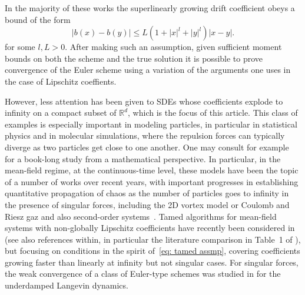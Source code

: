 \documentclass{article}
\newcommand{\pierre}[1]{\textcolor{blue}{#1}}
\begin{document}
In the majority of these works the superlinearly growing drift coefficient obeys a bound of the form
\begin{equation}\label{eq: tamed assmp}
    \lvert b(x)-b(y)\rvert\leq L(1+\lvert x\rvert^l+\lvert y\rvert^l)\lvert x-y\rvert.
\end{equation}
for some $l,L>0$. After making such an assumption, given sufficient moment bounds on both the scheme and the true solution it is possible to prove convergence of the Euler scheme using a variation of the arguments one uses in the case of Lipschitz coeffients.

However, less attention has been given to SDEs whose coefficients explode to infinity on a compact 
subset of $\mathbb{R}^d$, which is the focus of this article. This class of examples is especially important in modeling particles, in particular in statistical physics and in molecular simulations, where the repulsion forces can typically diverge as two particles get close to one another. One may consult \cite{29acd3d494044594aea0829ef236aad6} for example for a book-long study from a mathematical perspective. In particular, in the mean-field regime, at the continuous-time level, these models have been the topic of a number of works over recent years, with important progresses in establishing quantitative propagation of chaos as the number of particles goes to infinity in the presence of singular forces, including the 2D vortex model \cite{jabin2018quantitative,guillin2024uniform,monmarche2024time,wang2025sharp} or Coulomb and Riesz gaz \cite{Serfaty,de2023sharp,Guillin2022OnSO} and also second-order systems~\cite{2024arXiv240204695B}. Tamed algorithms for mean-field systems with non-globally Lipschitz  coefficients have recently been considered in \cite{2025arXiv251016427S,chen2025wellposedness,tran2025infinite} (see also references within, in particular the literature comparison in Table~1 of \cite{2025arXiv251016427S}), but focusing on conditions in the spirit of~\eqref{eq: tamed assmp}, covering coefficients growing faster than linearly at infinity but not singular cases. For singular forces, the weak convergence of a class of Euler-type schemes was studied in \cite{refId0} for the underdamped Langevin dynamics.
\end{document}
